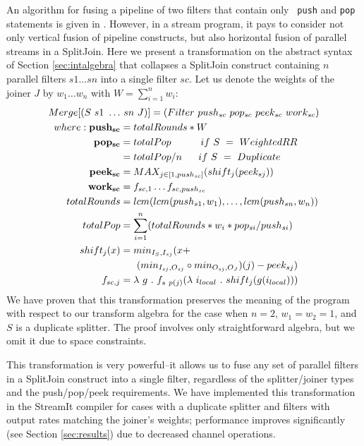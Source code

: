 An algorithm for fusing a pipeline of two filters that contain only {\tt
push} and {\tt pop} statements is given in \cite{pro96}.  However, in a
stream program, it pays to consider not only vertical fusion of pipeline
constructs, but also horizontal fusion of parallel streams in a
SplitJoin.  Here we present a transformation on the abstract syntax of
Section \ref{sec:intalgebra} that collapses a SplitJoin construct
containing $n$ parallel filters $s1 \dots sn$ into a single filter $sc$.
Let us denote the weights of the joiner $J$ by $w_1 \dots w_n$ with $W =
\sum_{i=1}^{n}{w_i}$:
\begin{align*}
Merge[(S~s1~\dots&~sn~J)] = (Filter~push_{sc}~pop_{sc}~peek_{sc}~work_{sc}) \\
where: {\bf push_{sc}} &= totalRounds * W \\
       {\bf pop_{sc}} &= totalPop ~~~~~~~~~if~S~=~WeightedRR \\
                &= totalPop / n ~~~~~if~S~=~Duplicate \\
       {\bf peek_{sc}} &= MAX_{j \in [1,push_{sc}]}(shift_j(peek_{sj})) \\
       {\bf work_{sc}} &= f_{sc, 1} \dots f_{sc, push_{sc}} \\
       totalRounds &= lcm(lcm(push_{s1}, w_1), \dots, lcm(push_{sn},
       w_n)) \\
       totalPop &= \sum_{i=1}^{n}(totalRounds * w_i * pop_{si} / push_{si}) \\
       shift_j(x) &= min_{I_S, I_{sj}}(x + \\ &~~~~~(min_{I_{sj}, O_{sj}} \circ min_{O_{sj}, O_J})(j)-peek_{sj}) \\
       f_{sc, j} &= \lambda~g~.~f_{s~p(j)}(\lambda~i_{local}~.~shift_j(g(i_{local})))
\end{align*}
We have proven that this transformation preserves the meaning of the
program with respect to our transform algebra for the case when $n = 2$,
$w_1 = w_2 = 1$, and $S$ is a duplicate splitter.  The proof involves
only straightforward algebra, but we omit it due to space constraints.

This transformation is very powerful--it allows us to fuse any set of
parallel filters in a SplitJoin construct into a single filter,
regardless of the splitter/joiner types and the push/pop/peek
requirements.  We have implemented this transformation in the StreamIt
compiler for cases with a duplicate splitter and filters with output
rates matching the joiner's weights; performance improves significantly
(see Section \ref{sec:results}) due to decreased channel operations.

